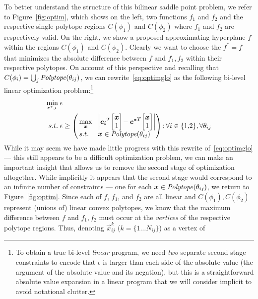To better understand the structure of this bilinear saddle point
problem, we refer to Figure~\ref{fig:optim}, which shows on the
left, two functions $f_1$ and $f_2$ and the respective single polytope
regions $C(\phi_1)$ and $C(\phi_2)$ where $f_1$ and $f_2$ are
respectively valid.  On the right, we show a proposed approximating
hyperplane $f$ within the regions $C(\phi_1)$ and $C(\phi_2)$.
Clearly we want to choose the $f^*=f$ that minimizes the absolute
difference between $f$ and $f_1,f_2$ within their respective polytopes.
On account of this perspective and recalling that $C(\phi_i)
= \bigcup_j \mathit{Polytope}(\theta_{ij})$, we can rewrite~\eqref{eq:optimglo} as
the following bi-level linear optimization problem:\footnote{
To obtain a true bi-level \emph{linear} program, we need \emph{two} separate
second stage constraints to encode that $\epsilon$ is larger than each
side of the absolute value (the argument of the absolute value and its
negation), but this is a straightforward absolute value expansion in a
linear program that we will consider implicit to avoid notational clutter.}
\begin{align}
\min_{\vec{c}^*,\epsilon} \; & \epsilon \label{eq:bilevel} \\
s.t. \;       & \epsilon \geq \left( \!\!
  \begin{array}{ll}
  \max\limits_{\vec{x}} \! & \left| \vec{c_i}^T \! \mb \vec{x}\\1 \me \! - \vec{c^*}^T \! \mb \vec{x}\\1 \me \right| \\ 
  s.t. \;              \! & \vec{x} \in \PT(\theta_{ij})
  \end{array} \!\!\! \right); \forall i \in \{ 1,\!2 \}, \forall \theta_{ij} \nonumber
\end{align}
While it may seem we have made little progress with this rewrite
of~\eqref{eq:optimglo} --- this still appears to be a difficult
optimization problem, we can make an important insight that allows
us to remove the second stage of optimization altogether.  While
implicitly it appears that the second stage would correspond to an
infinite number of constraints --- one for each
$\boldsymbol{x} \in \mathit{Polytope}(\theta_{ij})$, we return to Figure~\ref{fig:optim}.
Since each of $f$, $f_1$, and $f_2$ are all linear and
$C(\phi_1),C(\phi_2)$ represent (unions of) linear convex polytopes,
we know that the maximum difference between $f$ and $f_1,f_2$ must
occur at the \emph{vertices} of the respective polytope regions.
Thus, denoting $\vec{x}_{ij}^k$ ($k = \{ 1 \ldots N_{ij} \}$) as a vertex of
